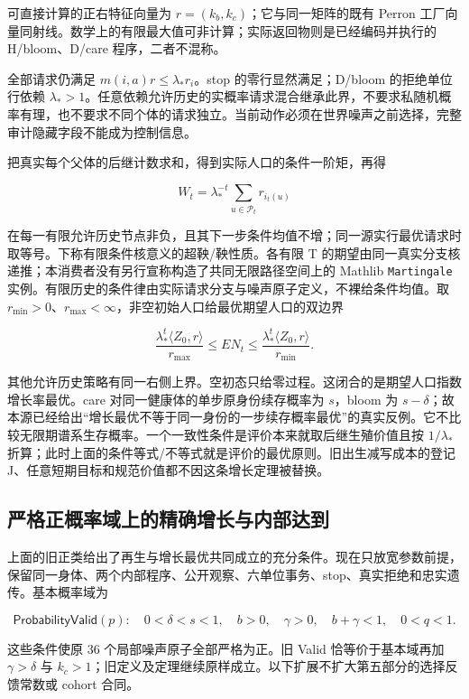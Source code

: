 \documentclass[
  11pt,
  oneside]{book}
\begin{document}
可直接计算的正右特征向量为 \(r=(k_b,k_c)\)；它与同一矩阵的既有 Perron 工厂向量同射线。数学上的有限最大值可非计算；实际返回物则是已经编码并执行的 H/bloom、D/care 程序，二者不混称。

全部请求仍满足 \(m(i,a)r\le\lambda_*r_i\)。stop 的零行显然满足；D/bloom 的拒绝单位行依赖 \(\lambda_*>1\)。任意依赖允许历史的实概率请求混合继承此界，不要求私随机概率有理，也不要求不同个体的请求独立。当前动作必须在世界噪声之前选择，完整审计隐藏字段不能成为控制信息。

把真实每个父体的后继计数求和，得到实际人口的条件一阶矩，再得

\[W_t=\lambda_*^{-t}\sum_{u\in\mathcal P_t}r_{i_t(u)}\]

在每一有限允许历史节点非负，且其下一步条件均值不增；同一源实行最优请求时取等号。下称有限条件核意义的超鞅/鞅性质。各有限 T 的期望由同一真实分支核递推；本消费者没有另行宣称构造了共同无限路径空间上的 Mathlib \texttt{Martingale} 实例。有限历史的条件律由实际请求分支与噪声原子定义，不裸给条件均值。取 \(r_{\min}>0\)、\(r_{\max}<\infty\)，非空初始人口给最优期望人口的双边界

\[\frac{\lambda_*^t\langle Z_0,r\rangle}{r_{\max}}
\le E N_t\le
\frac{\lambda_*^t\langle Z_0,r\rangle}{r_{\min}}.\]

其他允许历史策略有同一右侧上界。空初态只给零过程。这闭合的是期望人口指数增长率最优。care 对同一健康体的单步原身份续存概率为 \(s\)，bloom 为 \(s-\delta\)；故本源已经给出``增长最优不等于同一身份的一步续存概率最优''的真实反例。它不比较无限期谱系生存概率。一个一致性条件是评价本来就取后继生殖价值且按 \(1/\lambda_*\) 折算；此时上面的条件等式/不等式就是评价的最优原则。旧出生减写成本的登记 J、任意短期目标和规范价值都不因这条增长定理被替换。

\subsection{严格正概率域上的精确增长与内部达到}\label{core-growth-classification}

上面的旧正类给出了再生与增长最优共同成立的充分条件。现在只放宽参数前提，保留同一身体、两个内部程序、公开观察、六单位事务、stop、真实拒绝和忠实遗传。基本概率域为

\[\mathsf{ProbabilityValid}(p):\quad
0<\delta<s<1,\quad b>0,\quad \gamma>0,\quad
b+\gamma<1,\quad 0<q<1.\]

这些条件使原 36 个局部噪声原子全部严格为正。旧 Valid 恰等价于基本域再加 \(\gamma>\delta\) 与 \(k_c>1\)；旧定义及定理继续原样成立。以下扩展不扩大第五部分的选择反馈常数或 cohort 合同。
\end{document}
